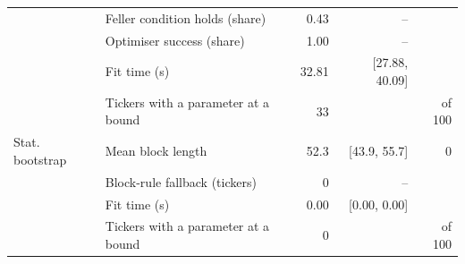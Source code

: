 \begin{tabular}{llrrr}
 & Feller condition holds (share) & 0.43 & -- &  \\
 & Optimiser success (share) & 1.00 & -- &  \\
 & Fit time (s) & 32.81 & [27.88, 40.09] &  \\
 & Tickers with a parameter at a bound & 33 &  & of 100 \\
Stat. bootstrap & Mean block length & 52.3 & [43.9, 55.7] & 0 \\
 & Block-rule fallback (tickers) & 0 & -- &  \\
 & Fit time (s) & 0.00 & [0.00, 0.00] &  \\
 & Tickers with a parameter at a bound & 0 &  & of 100 \\
\bottomrule
\end{tabular}
